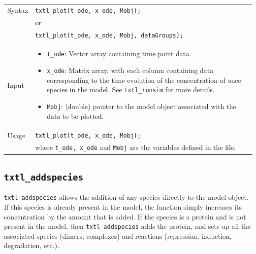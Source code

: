 \documentclass[english]{report}
\begin{document}
		\begin{tabular}{p{2cm}|p{13cm}}
			Syntax & \texttt{txtl\_plot(t\_ode, x\_ode, Mobj);}\\
			& or \\
			& \texttt{txtl\_plot(t\_ode, x\_ode, Mobj, dataGroups);}\\ \hline
			Input &  \begin{itemize}
				\item \texttt{t\_ode}: Vector array containing time point data. 
				\item \texttt{x\_ode}: Matrix array, with each column containing data corresponding to the time evolution of the concentration of once species in the model. See \texttt{txtl\_runsim} for more details.  
				\item \texttt{Mobj}: (double) pointer to the model object associated with the data to be plotted.
				\end{itemize} \\ \hline
			Usage & \texttt{txtl\_plot(t\_ode, x\_ode, Mobj);}\\
			& where \texttt{t\_ode, x\_ode} and \texttt{Mobj} are the variables defined in the file. 
			\end{tabular}
		
		
		\subsection*{\texttt{txtl\_addspecies}}
			\texttt{txtl\_addspecies} allows the addition of any species directly to the model object. If this species is already present in the model, the function simply increases its concentration by the amount that is added. If the species is a protein and is not present in the model, then \texttt{txtl\_addspecies} adds the protein, and sets up all the associated species (dimers, complexes) and reactions (repression, induction, degradation, etc.). \\
			
\end{document}
